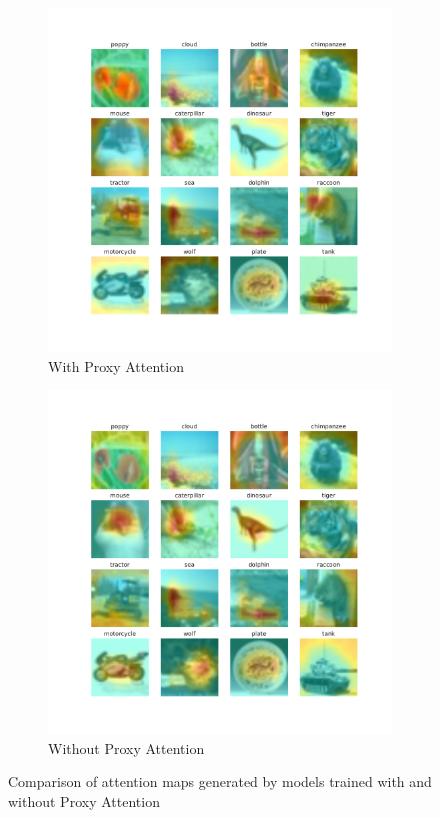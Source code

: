 \begin{figure}[h]
    \centering
    \begin{subfigure}[b]{0.7\textwidth}
        \includegraphics[width=\textwidth]{images/proxy_1.pdf}
        \caption{With Proxy Attention}
        \label{fig:proxy2}
    \end{subfigure}
    \hfill
    \begin{subfigure}[b]{.7\textwidth}
        \includegraphics[width=\textwidth]{images/noproxy_1.pdf}
        \caption{Without Proxy Attention}
        \label{fig:noproxy2}
    \end{subfigure}
    \caption{Comparison of attention maps generated by models trained with and without Proxy Attention}
    \label{fig:attention2}
\end{figure}

